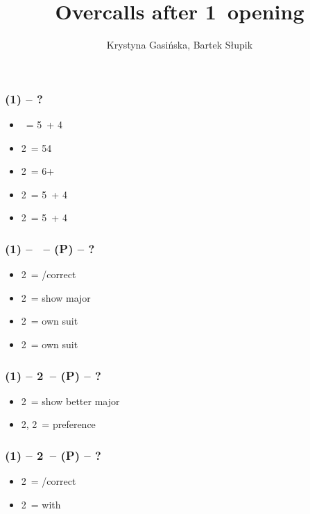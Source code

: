 \documentclass[12pt, a4paper]{article}
\title{Overcalls after 1\ntx\ opening}
\author{Krystyna Gasińska, Bartek Słupik}
\begin{document}
\maketitle


\subsubsection*{(1\ntx) -- ?}
\begin{itemize}
    \item \dbl\ = 5\minor\ + 4\major
    \item 2\clubs\ = 54 \major
    \item 2\diams\ = 6+ \major
    \item 2\hearts\ = 5\hearts\ + 4\minor
    \item 2\spades\ = 5\spades\ + 4\minor
\end{itemize}

\subsubsection*{(1\ntx) -- \dbl\ -- (P) -- ?}
\begin{itemize}
    \item 2\clubs\ = \pass/correct
    \item 2\diams\ = show major
    \item 2\hearts\ = own suit
    \item 2\spades\ = own suit
\end{itemize}

\subsubsection*{(1\ntx) -- 2\clubs\ -- (P) -- ?}
\begin{itemize}
    \item 2\diams\ = show better major
    \item 2\hearts, 2\spades\ = preference
\end{itemize}

\subsubsection*{(1\ntx) -- 2\diams\ -- (P) -- ?}
\begin{itemize}
    \item 2\hearts\ = \pass/correct
    \item 2\spades\ = \inv with \hearts
\end{itemize}

\end{document}
